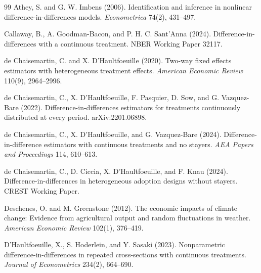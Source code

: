 \documentclass[11pt]{article}
\theoremstyle{definition}
\theoremstyle{plain}
\theoremstyle{remark}
\begin{document}
\begin{thebibliography}{99}
Athey, S. and G. W. Imbens (2006).
\newblock Identification and inference in nonlinear difference-in-differences models.
\newblock \emph{Econometrica} 74(2), 431--497.

Callaway, B., A. Goodman-Bacon, and P. H. C. Sant'Anna (2024).
\newblock Difference-in-differences with a continuous treatment.
\newblock NBER Working Paper 32117.

de Chaisemartin, C. and X. D'Haultfoeuille (2020).
\newblock Two-way fixed effects estimators with heterogeneous treatment effects.
\newblock \emph{American Economic Review} 110(9), 2964--2996.

de Chaisemartin, C., X. D'Haultfoeuille, F. Pasquier, D. Sow, and G. Vazquez-Bare (2022).
\newblock Difference-in-differences estimators for treatments continuously distributed at every period.
\newblock arXiv:2201.06898.

de Chaisemartin, C., X. D'Haultfoeuille, and G. Vazquez-Bare (2024).
\newblock Difference-in-difference estimators with continuous treatments and no stayers.
\newblock \emph{AEA Papers and Proceedings} 114, 610--613.

de Chaisemartin, C., D. Ciccia, X. D'Haultfoeuille, and F. Knau (2024).
\newblock Difference-in-differences in heterogeneous adoption designs without stayers.
\newblock CREST Working Paper.

Deschenes, O. and M. Greenstone (2012).
\newblock The economic impacts of climate change: Evidence from agricultural output and random fluctuations in weather.
\newblock \emph{American Economic Review} 102(1), 376--419.

D'Haultfoeuille, X., S. Hoderlein, and Y. Sasaki (2023).
\newblock Nonparametric difference-in-differences in repeated cross-sections with continuous treatments.
\newblock \emph{Journal of Econometrics} 234(2), 664--690.


\end{thebibliography}
\end{document}

